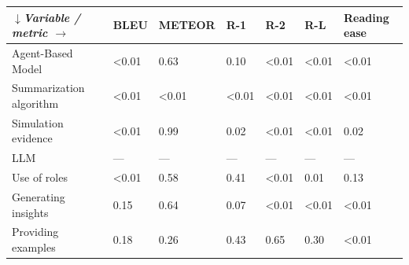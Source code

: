 \begin{tabular}{|l|l|l|l|l|l|l|}
\hline
\textit{$\downarrow$Variable / metric $\rightarrow$} & BLEU & METEOR & R-1 & R-2 & R-L & Reading ease \\
 \hline
 Agent-Based Model & \textless{}0.01 & 0.63 & 0.10 & \textless{}0.01 & \textless{}0.01 & \textless{}0.01 \\
 \hline
 Summarization algorithm & \textless{}0.01 & \textless{}0.01 & \textless{}0.01 & \textless{}0.01 & \textless{}0.01 & \textless{}0.01 \\
 \hline
 Simulation evidence & \textless{}0.01 & 0.99 & 0.02 & \textless{}0.01 & \textless{}0.01 & 0.02 \\
 \hline
 LLM & — & — & — & — & — & — \\
 \hline
 Use of roles & \textless{}0.01 & 0.58 & 0.41 & \textless{}0.01 & 0.01 & 0.13 \\
 \hline
 Generating insights & 0.15 & 0.64 & 0.07 & \textless{}0.01 & \textless{}0.01 & \textless{}0.01 \\
 \hline
 Providing examples & 0.18 & 0.26 & 0.43 & 0.65 & 0.30 & \textless{}0.01 \\
\hline
\end{tabular}
